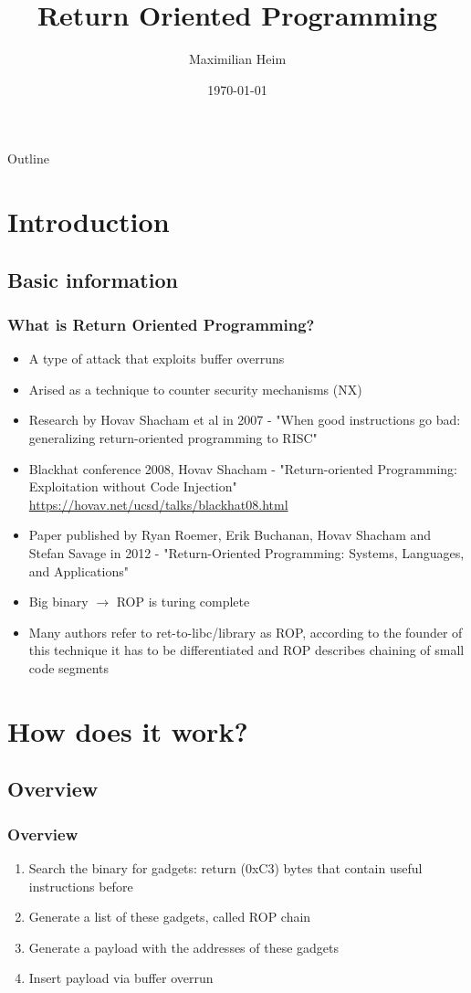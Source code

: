 \documentclass[11pt]{beamer}
\author{Maximilian Heim}
\title{Return Oriented Programming}
\institute{University Albstadt-Sigmaringen}
\date{\today}
\begin{document}
\begin{frame}
\titlepage
\end{frame}

\begin{frame}{Outline}
\tableofcontents
\end{frame}

\section{Introduction}
\subsection{Basic information}
\begin{frame}
    \frametitle{What is Return Oriented Programming?}
    \begin{itemize}
    \item A type of attack that exploits buffer overruns
    \item Arised as a technique to counter security mechanisms (NX)
    \item Research by Hovav Shacham et al in 2007 - "When good instructions go bad: generalizing return-oriented programming to RISC"
    \item Blackhat conference 2008, Hovav Shacham - "Return-oriented Programming:
    Exploitation without Code Injection" \url{https://hovav.net/ucsd/talks/blackhat08.html}
    \item Paper published by Ryan Roemer, Erik Buchanan, Hovav Shacham and Stefan Savage in 2012 - "Return-Oriented Programming: Systems, Languages, and Applications" 
    \item Big binary $\rightarrow$ ROP is turing complete
    \item Many authors refer to ret-to-libc/library as ROP, according to the founder of this technique it has to be differentiated and ROP describes chaining of small code segments
    \end{itemize}
\end{frame}

\section{How does it work?}
\subsection{Overview}
\begin{frame}
    \frametitle{Overview}
    \begin{enumerate}
        \item Search the binary for gadgets: return (0xC3) bytes that contain useful instructions before
        \item Generate a list of these gadgets, called ROP chain
        \item Generate a payload with the addresses of these gadgets
        \item Insert payload via buffer overrun
    \end{enumerate} 
\end{frame}
\end{document}
